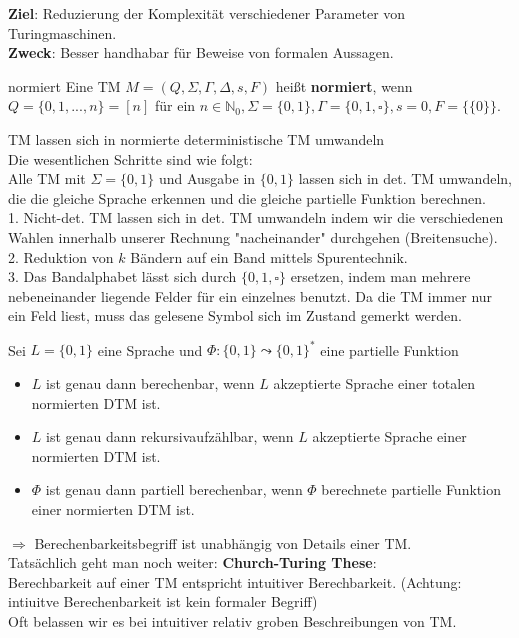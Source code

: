 \textbf{Ziel}: Reduzierung der Komplexität verschiedener Parameter von Turingmaschinen. \\
\textbf{Zweck}: Besser handhabar für Beweise von formalen Aussagen. \\

\begin{defn}{normiert}
    Eine TM $M = (Q, \Sigma, \Gamma, \Delta, s, F)$ heißt \textbf{normiert}, wenn $Q = \{0,1,...,n\} = [n]$ für ein
    $n \in \mathbb{N}_0, \Sigma = \{0,1\}, \Gamma = \{0,1,\square\}, s=0, F = \{\{0\}\}$.
\end{defn}

TM lassen sich in normierte deterministische TM umwandeln \\
Die wesentlichen Schritte sind wie folgt: \\
Alle TM mit $\Sigma=\{0,1\}$ und Ausgabe in $\{0,1\}$ lassen sich in det. TM umwandeln,
die die gleiche Sprache erkennen und die gleiche partielle Funktion berechnen. \\

1. Nicht-det. TM  lassen sich in det. TM umwandeln indem wir die verschiedenen Wahlen innerhalb 
unserer Rechnung "nacheinander" durchgehen (Breitensuche). \\


2. Reduktion von $k$ Bändern auf ein Band mittels Spurentechnik. \\


3. Das Bandalphabet lässt sich durch $\{0,1,\square\}$ ersetzen, indem man mehrere nebeneinander
liegende Felder für ein einzelnes benutzt. Da die TM immer nur ein Feld liest, muss das gelesene Symbol sich im Zustand gemerkt werden.


\begin{bem}
    Sei $L = \{0,1\}$ eine Sprache und $\Phi : \{0,1\} \leadsto \{0,1\}^*$ eine partielle Funktion
    \begin{itemize}
        \item $L$ ist genau dann berechenbar, wenn $L$ akzeptierte Sprache einer totalen normierten DTM ist.
        \item $L$ ist genau dann rekursivaufzählbar, wenn $L$ akzeptierte Sprache einer normierten DTM ist.
        \item $\Phi$ ist genau dann partiell berechenbar, wenn $\Phi$ berechnete partielle Funktion einer normierten DTM ist.
    \end{itemize}
    $\Rightarrow$ Berechenbarkeitsbegriff ist unabhängig von Details einer TM. \\
    
    Tatsächlich geht man noch weiter: \textbf{Church-Turing These}: \\
    Berechbarkeit auf einer TM entspricht intuitiver Berechbarkeit. (Achtung: intiuitve Berechenbarkeit ist kein formaler Begriff) \\
    Oft belassen wir es bei intuitiver relativ groben Beschreibungen von TM.
\end{bem}

